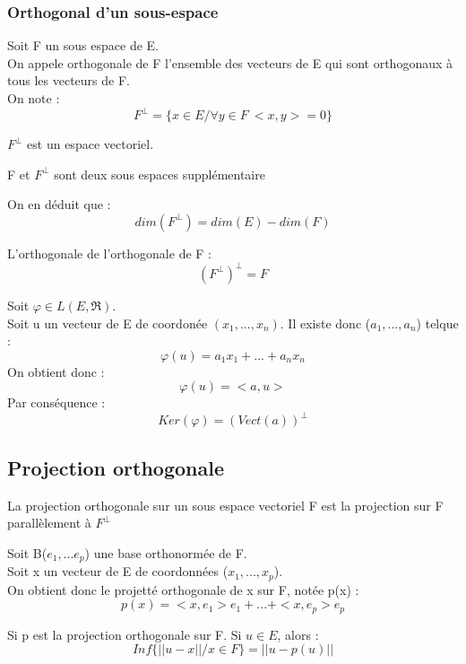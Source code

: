 \subsubsection{Orthogonal d'un sous-espace}
\begin{de}
Soit F un sous espace de E.\\
On appele orthogonale de F l'ensemble des vecteurs de E qui sont orthogonaux à tous les vecteurs de F.\\
On note :
$$F^{\bot} = \{x\in E / \forall y \in F~ <x,y>=0\}$$
\end{de}
\begin{prop}
$F^{\bot}$ est un espace vectoriel.
\end{prop}
\begin{prop}
F et $F^{\bot}$ sont deux sous espaces supplémentaire
\end{prop}
\begin{prop}
On en déduit que :
$$dim(F^{\bot})=dim(E) - dim(F)$$
\end{prop}
\begin{prop}
L'orthogonale de l'orthogonale de F :
$$(F^{\bot})^{\bot} = F$$
\end{prop}
\begin{prop}
Soit $\varphi \in L(E,\Re)$.\\
Soit u un vecteur de E de coordonée $(x_1,...,x_n)$. Il existe donc ($a_1,...,a_n$) telque :
$$\varphi(u) = a_1x_1+...+a_nx_n$$
On obtient donc : 
$$\varphi(u) = <a,u>$$
Par conséquence :
$$Ker(\varphi) = (Vect(a))^{\bot}$$
\end{prop}
\subsection{Projection orthogonale}
\begin{de}
La projection orthogonale sur un sous espace vectoriel F est la projection sur F parallèlement à $F^{\bot}$
\end{de}
\begin{de}
Soit B($e_1,...e_p$) une base orthonormée de F.\\
Soit x un vecteur de E de coordonnées ($x_1,...,x_p$).\\
On obtient donc le projetté orthogonale de x sur F, notée p(x) : 
$$p(x)=<x,e_1>e_1+...+<x,e_p>e_p$$
\end{de}
\begin{prop}
Si p est la projection orthogonale sur F. Si $u \in E$, alors :
$$Inf\{||u-x|| / x \in F \} = ||u - p(u)||$$
\end{prop}


